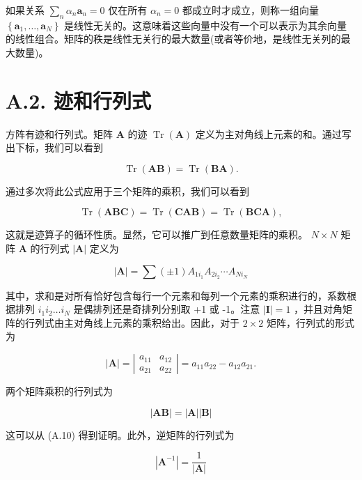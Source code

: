\documentclass[10pt]{report}
\begin{document}
如果关系 \(\mathop{\sum }\limits_{n}{\alpha }_{n}{\mathbf{a}}_{n} = 0\) 仅在所有 \({\alpha }_{n} = 0\) 都成立时才成立，则称一组向量 \(\left\{  {{\mathbf{a}}_{1},\ldots ,{\mathbf{a}}_{N}}\right\}\) 是线性无关的。这意味着这些向量中没有一个可以表示为其余向量的线性组合。矩阵的秩是线性无关行的最大数量(或者等价地，是线性无关列的最大数量)。

\section*{A.2. 迹和行列式}

方阵有迹和行列式。矩阵 \(\mathbf{A}\) 的迹 \(\operatorname{Tr}\left( \mathbf{A}\right)\) 定义为主对角线上元素的和。通过写出下标，我们可以看到

\[
\operatorname{Tr}\left( \mathbf{{AB}}\right)  = \operatorname{Tr}\left( \mathbf{{BA}}\right) . \tag{A.8}
\]

通过多次将此公式应用于三个矩阵的乘积，我们可以看到

\[
\operatorname{Tr}\left( \mathbf{{ABC}}\right)  = \operatorname{Tr}\left( \mathbf{{CAB}}\right)  = \operatorname{Tr}\left( \mathbf{{BCA}}\right) , \tag{A.9}
\]

这就是迹算子的循环性质。显然，它可以推广到任意数量矩阵的乘积。 \(N \times  N\) 矩阵 \(\mathbf{A}\) 的行列式 \(\left| \mathbf{A}\right|\) 定义为

\[
\left| \mathbf{A}\right|  = \sum \left( {\pm 1}\right) {A}_{1{i}_{1}}{A}_{2{i}_{2}}\cdots {A}_{N{i}_{N}} \tag{A.10}
\]

其中，求和是对所有恰好包含每行一个元素和每列一个元素的乘积进行的，系数根据排列 \({i}_{1}{i}_{2}\ldots {i}_{N}\) 是偶排列还是奇排列分别取 +1 或 -1。注意 \(\left| \mathbf{I}\right|  = 1\) ，并且对角矩阵的行列式由主对角线上元素的乘积给出。因此，对于 \(2 \times  2\) 矩阵，行列式的形式为

\[
\left| \mathbf{A}\right|  = \left| \begin{array}{ll} {a}_{11} & {a}_{12} \\  {a}_{21} & {a}_{22} \end{array}\right|  = {a}_{11}{a}_{22} - {a}_{12}{a}_{21}. \tag{A.11}
\]

两个矩阵乘积的行列式为

\[
\left| \mathbf{{AB}}\right|  = \left| \mathbf{A}\right| \left| \mathbf{B}\right|  \tag{A.12}
\]

这可以从 (A.10) 得到证明。此外，逆矩阵的行列式为

\[
\left| {\mathbf{A}}^{-1}\right|  = \frac{1}{\left| \mathbf{A}\right| } \tag{A.13}
\]
\end{document}

